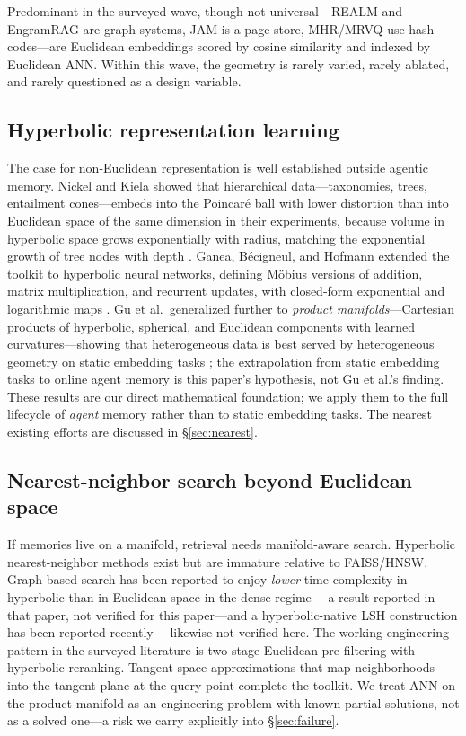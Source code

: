 \documentclass[11pt,a4paper]{article}
\begin{document}
Predominant in the surveyed wave, though not universal---REALM and
EngramRAG are graph systems, JAM is a page-store, MHR/MRVQ use hash
codes---are Euclidean embeddings scored by cosine similarity and indexed
by Euclidean ANN. Within this wave, the geometry is rarely varied, rarely
ablated, and rarely questioned as a design variable.

\subsection{Hyperbolic representation learning}

The case for non-Euclidean representation is well established outside
agentic memory. Nickel and Kiela showed that hierarchical data---taxonomies,
trees, entailment cones---embeds into the Poincar\'e ball with lower
distortion than into Euclidean space of the same dimension in their
experiments, because volume in hyperbolic space grows exponentially with
radius, matching the exponential growth of tree nodes with depth
\cite{nickel2017}. Ganea,
B\'ecigneul, and Hofmann extended the toolkit to hyperbolic neural
networks, defining M\"obius versions of addition, matrix multiplication,
and recurrent updates, with closed-form exponential and logarithmic maps
\cite{ganea2018}. Gu et al.\ generalized further to \emph{product
manifolds}---Cartesian products of hyperbolic, spherical, and Euclidean
components with learned curvatures---showing that heterogeneous data is
best served by heterogeneous geometry on static embedding tasks
\cite{gu2019}; the extrapolation from static embedding tasks to online
agent memory is this paper's hypothesis, not Gu et al.'s finding. These results are our
direct mathematical foundation; we apply them to the full lifecycle of
\emph{agent} memory rather than to static embedding tasks. The nearest
existing efforts are discussed in \S\ref{sec:nearest}.

\subsection{Nearest-neighbor search beyond Euclidean space}
\label{sec:related-ann}

If memories live on a manifold, retrieval needs manifold-aware search.
Hyperbolic nearest-neighbor methods exist but are immature relative to
FAISS/HNSW. Graph-based search has been reported to enjoy \emph{lower} time
complexity in hyperbolic than in Euclidean space in the dense regime
\cite{prokhorenkova2022}---a result reported in that paper, not verified
for this paper---and a hyperbolic-native LSH construction has been
reported recently \cite{deng2026}---likewise not verified here. The working engineering
pattern in the surveyed literature is two-stage Euclidean pre-filtering with hyperbolic reranking. Tangent-space approximations that map neighborhoods into the
tangent plane at the query point complete the toolkit. We treat ANN on the
product manifold as an engineering problem with known partial solutions,
not as a solved one---a risk we carry explicitly into \S\ref{sec:failure}.
\end{document}

